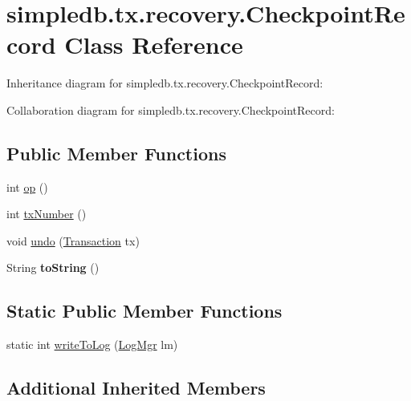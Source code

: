 \hypertarget{classsimpledb_1_1tx_1_1recovery_1_1CheckpointRecord}{}\section{simpledb.\+tx.\+recovery.\+Checkpoint\+Record Class Reference}
\label{classsimpledb_1_1tx_1_1recovery_1_1CheckpointRecord}


Inheritance diagram for simpledb.\+tx.\+recovery.\+Checkpoint\+Record\+:


Collaboration diagram for simpledb.\+tx.\+recovery.\+Checkpoint\+Record\+:
\subsection*{Public Member Functions}
\begin{DoxyCompactItemize}
\item 
int \hyperlink{classsimpledb_1_1tx_1_1recovery_1_1CheckpointRecord_add91e88d6b4eb9ed6cfff2d8d8cc021f}{op} ()
\item 
int \hyperlink{classsimpledb_1_1tx_1_1recovery_1_1CheckpointRecord_aea455bb47be4edb732b0da09ca308dda}{tx\+Number} ()
\item 
void \hyperlink{classsimpledb_1_1tx_1_1recovery_1_1CheckpointRecord_a4972aad5462b30acfd987cf21b3fc7c2}{undo} (\hyperlink{classsimpledb_1_1tx_1_1Transaction}{Transaction} tx)
\item 
\mbox{\label{classsimpledb_1_1tx_1_1recovery_1_1CheckpointRecord_ad395c7b39d32d5c965e0ec5dc8e9dfac}} 
String {\bfseries to\+String} ()
\end{DoxyCompactItemize}
\subsection*{Static Public Member Functions}
\begin{DoxyCompactItemize}
\item 
static int \hyperlink{classsimpledb_1_1tx_1_1recovery_1_1CheckpointRecord_ae8556c19188908e304e1592690689d3e}{write\+To\+Log} (\hyperlink{classsimpledb_1_1log_1_1LogMgr}{Log\+Mgr} lm)
\end{DoxyCompactItemize}
\subsection*{Additional Inherited Members}


